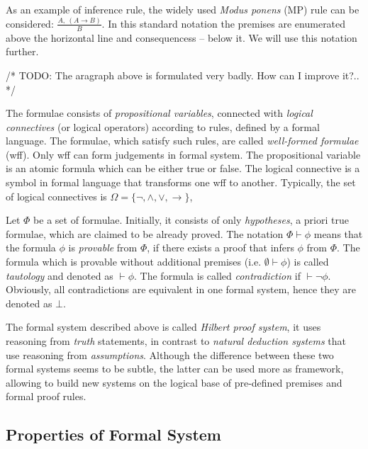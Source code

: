 \documentclass[article]{aaltoseries}
\begin{document}
As an example of inference rule, the widely used \textit{Modus ponens} (MP) rule can be considered: ${ {\frac {A,\ (A\rightarrow B)}{B}}}$. In this standard notation the premises are enumerated above the horizontal line and consequencess -- below it. We will use this notation further. 

/* TODO: The aragraph above is formulated very badly. How can I improve it?.. */

The formulae consists of \textit{propositional variables}, connected with \textit{logical connectives} (or logical operators) according to rules, defined by a formal language. The formulae, which satisfy such rules, are called \textit{well-formed formulae} (wff). Only wff can form judgements in formal system. The propositional variable is an atomic formula which can be either true or false. The logical connective is a symbol in formal language that transforms one wff to another. Typically, the set of logical connectives is $\Omega = \{ \neg, \land, \lor, \rightarrow \}$,

Let $\Phi$ be a set of formulae. Initially, it consists of only \textit{hypotheses}, a priori true formulae, which are claimed to be already proved. The notation $\Phi \vdash \phi$ means that the formula $\phi$ is \textit{provable} from $\Phi$, if there exists a proof that infers $\phi$ from $\Phi$. The formula which is provable without additional premises (i.e. $\emptyset \vdash \phi$) is called \textit{tautology} and denoted as $ \vdash \phi $. The formula is called \textit{contradiction} if $\vdash \neg \phi$. Obviously, all contradictions are equivalent in one formal system, hence they are denoted as $\bot$.

The formal system described above is called \textit{Hilbert proof system}, it uses reasoning from \textit{truth} statements, in contrast to \textit{natural deduction systems} that use reasoning from \textit{assumptions}. Although the difference between these two formal systems seems to be subtle, the latter can be used more as framework, allowing to build new systems on the logical base of pre-defined premises and formal proof rules. %

\subsection{Properties of Formal System}
\end{document}
